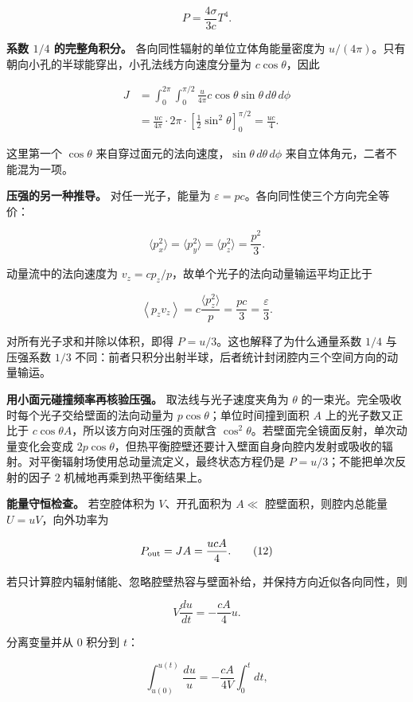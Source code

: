 \documentclass[12pt,a4paper,UTF8]{ctexart}
\begin{document}
\[
\boxed{P=\frac{4\sigma}{3c}T^4}. \tag{8}
\]

\textbf{系数 \(1/4\) 的完整角积分。} 各向同性辐射的单位立体角能量密度为
\(u/(4\pi)\)。只有朝向小孔的半球能穿出，小孔法线方向速度分量为
\(c\cos\theta\)，因此

\[
\begin{aligned}
J&=\int_0^{2\pi}\!\int_0^{\pi/2}
\frac{u}{4\pi}c\cos\theta\sin\theta\,d\theta\,d\phi\\
&=\frac{uc}{4\pi}\cdot2\pi\cdot
\left[\frac12\sin^2\theta\right]_0^{\pi/2}
=\frac{uc}{4}. 
\end{aligned} \tag{9}
\]

这里第一个 \(\cos\theta\)
来自穿过面元的法向速度，\(\sin\theta\,d\theta\,d\phi\)
来自立体角元，二者不能混为一项。

\textbf{压强的另一种推导。} 对任一光子，能量为
\(\varepsilon=pc\)。各向同性使三个方向完全等价：

\[
\langle p_x^2\rangle=
\langle p_y^2\rangle=
\langle p_z^2\rangle=\frac{p^2}{3}. \tag{10}
\]

动量流中的法向速度为 \(v_z=cp_z/p\)，故单个光子的法向动量输运平均正比于

\[
\left\langle p_zv_z\right\rangle
=c\frac{\langle p_z^2\rangle}{p}
=\frac{pc}{3}=\frac{\varepsilon}{3}. \tag{11}
\]

对所有光子求和并除以体积，即得 \(P=u/3\)。这也解释了为什么通量系数
\(1/4\) 与压强系数 \(1/3\)
不同：前者只积分出射半球，后者统计封闭腔内三个空间方向的动量输运。

\textbf{用小面元碰撞频率再核验压强。} 取法线与光子速度夹角为 \(\theta\)
的一束光。完全吸收时每个光子交给壁面的法向动量为
\(p\cos\theta\)；单位时间撞到面积 \(A\) 上的光子数又正比于
\(c\cos\theta A\)，所以该方向对压强的贡献含
\(\cos^2\theta\)。若壁面完全镜面反射，单次动量变化会变成
\(2p\cos\theta\)，但热平衡腔壁还要计入壁面自身向腔内发射或吸收的辐射。对平衡辐射场使用总动量流定义，最终状态方程仍是
\(P=u/3\)；不能把单次反射的因子 \(2\) 机械地再乘到热平衡结果上。

\textbf{能量守恒检查。} 若空腔体积为 \(V\)、开孔面积为 \(A\ll\)
腔壁面积，则腔内总能量 \(U=uV\)，向外功率为

\[
P_{\rm out}=JA=\frac{ucA}{4}. \tag{12}
\]

若只计算腔内辐射储能、忽略腔壁热容与壁面补给，并保持方向近似各向同性，则

\[
V\frac{du}{dt}=-\frac{cA}{4}u.
\]

分离变量并从 \(0\) 积分到 \(t\)：

\[
\int_{u(0)}^{u(t)}\frac{du}{u}
=-\frac{cA}{4V}\int_0^t dt,
\]
\end{document}

